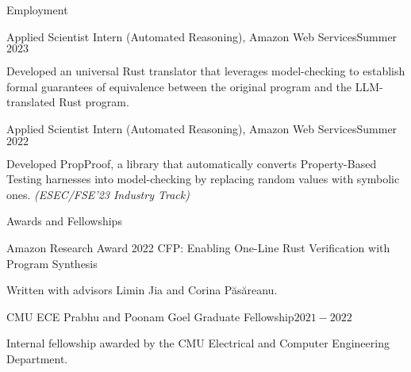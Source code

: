 \documentclass{resume} %
\begin{document}
\begin{rSection}{Employment}

  \begin{rSubsection}{Applied Scientist Intern (Automated Reasoning),
      Amazon Web Services}{Summer $2023$} {}{}
  \item Developed an universal Rust translator that leverages
    model-checking to establish formal guarantees of equivalence
    between the original program and the LLM-translated Rust program.
  \end{rSubsection}

  \begin{rSubsection}{Applied Scientist Intern (Automated Reasoning),
      Amazon Web Services}{Summer $2022$} {}{}
  \item Developed PropProof, a library that automatically converts
    Property-Based Testing harnesses into model-checking by replacing
    random values with symbolic ones. \textit{(ESEC/FSE'23 Industry Track)}
  \end{rSubsection}
\end{rSection}


\begin{rSection}{Awards and Fellowships}

  \begin{rSubsection}{Amazon Research Award 2022 CFP: Enabling One-Line Rust
      Verification with Program Synthesis}{}{}{}
  \item Written with advisors Limin Jia and Corina P\u{a}s\u{a}reanu.
  \end{rSubsection}

  \begin{rSubsection}{CMU ECE Prabhu and Poonam Goel Graduate
      Fellowship}{$2021 - 2022$}{}{}
  \item Internal fellowship awarded by the CMU Electrical and Computer
    Engineering Department.
  \end{rSubsection}
\end{rSection}
\end{document}
